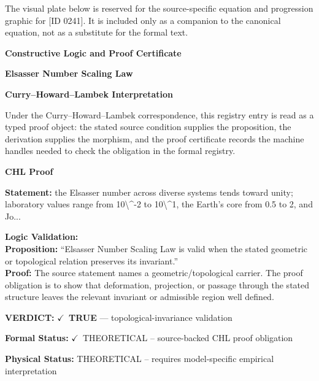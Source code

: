 \begingroup\footnotesize\sloppy
The visual plate below is reserved for the source-specific equation and progression graphic for [ID 0241]. It is included only as a companion to the canonical equation, not as a substitute for the formal text.
\par\endgroup
\ifTZPDarkEdition
{}
\fi

\clearpage
\begingroup\tzpsupportsetup
\noindent\textbf{\fontsize{10.8pt}{12.8pt}\selectfont [ID 0241] Constructive Logic and Proof Certificate}\par
\noindent\textbf{\fontsize{10pt}{12pt}\selectfont Elsasser Number Scaling Law}\par
\vspace{0.45em}
\begingroup
\footnotesize
\setlength{\parskip}{0.22em}
\setlength{\parindent}{0pt}
\noindent\textbf{Curry--Howard--Lambek Interpretation}\par
Under the Curry--Howard--Lambek correspondence, this registry entry is read as a typed proof
object: the stated source condition supplies the proposition, the derivation supplies the
morphism, and the proof certificate records the machine handles needed to check the obligation
in the formal registry.

\vspace{0.45em}
\noindent\textbf{CHL Proof}\par
\textbf{Statement:} the Elsasser number across diverse systems tends toward unity; laboratory values range
from 10\textbackslash{}\textasciicircum{}-2 to 10\textbackslash{}\textasciicircum{}1, the Earth's core from 0.5 to 2, and Jo...

\textbf{Logic Validation:}\\
\textbf{Proposition:} ``Elsasser Number Scaling Law is valid when the stated geometric or topological relation
preserves its invariant.''\\
\textbf{Proof:} The source statement names a geometric/topological carrier. The proof obligation is to
show that deformation, projection, or passage through the stated structure leaves the
relevant invariant or admissible region well defined.

\textbf{VERDICT:} \ensuremath{\checkmark}\ \textbf{TRUE} --- topological-invariance validation

\textbf{Formal Status:} \ensuremath{\checkmark}\ THEORETICAL -- source-backed CHL proof obligation

\textbf{Physical Status:} THEORETICAL -- requires model-specific empirical interpretation
\par\vspace{0.45em}
\par
\ifTZPDarkEdition
{}
\fi
\endgroup
\endgroup
